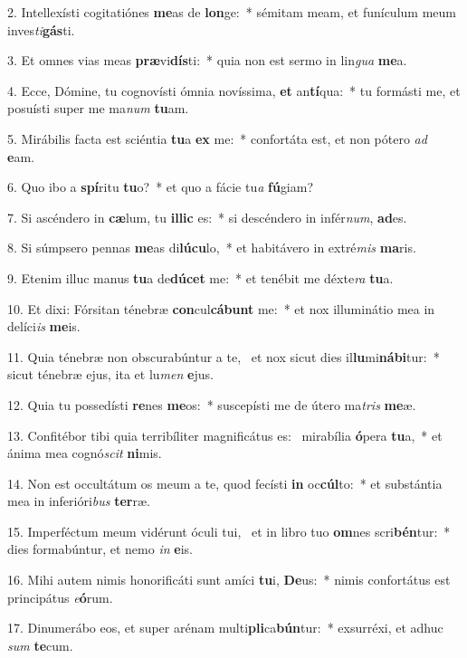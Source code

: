 2. Intellexísti cogitatiónes \textbf{me}as de \textbf{lon}ge:~*  sémitam meam, et funículum meum inves\textit{ti}\textbf{gás}ti.\

3. Et omnes vias meas \textbf{præ}vi\textbf{dís}ti:~*  quia non est sermo in lin\textit{gua} \textbf{me}a.\

4. Ecce, Dómine, tu cognovísti ómnia novíssima, \textbf{et} an\textbf{tí}qua:~*  tu formásti me, et posuísti super me ma\textit{num} \textbf{tu}am.\

5. Mirábilis facta est sciéntia \textbf{tu}a \textbf{ex} me:~*  confortáta est, et non pótero \textit{ad} \textbf{e}am.\

6. Quo ibo a \textbf{spí}ritu \textbf{tu}o?~*  et quo a fácie tu\textit{a} \textbf{fú}giam?\

7. Si ascéndero in \textbf{cæ}lum, tu \textbf{il}\textbf{lic} es:~*  si descéndero in infér\textit{num}, \textbf{ad}es.\

8. Si súmpsero pennas \textbf{me}as di\textbf{lú}\textbf{cu}lo,~*  et habitávero in extré\textit{mis} \textbf{ma}ris.\

9. Etenim illuc manus \textbf{tu}a de\textbf{dú}\textbf{cet} me:~*  et tenébit me déxte\textit{ra} \textbf{tu}a.\

10. Et dixi: Fórsitan ténebræ \textbf{con}cul\textbf{cá}\textbf{bunt} me:~*  et nox illuminátio mea in delíci\textit{is} \textbf{me}is.\

11. Quia ténebræ non obscurabúntur a te, \dag\  et nox sicut dies il\textbf{lu}mi\textbf{ná}\textbf{bi}tur:~*  sicut ténebræ ejus, ita et lu\textit{men} \textbf{e}jus.\

12. Quia tu possedísti \textbf{re}nes \textbf{me}os:~*  suscepísti me de útero ma\textit{tris} \textbf{me}æ.\

13. Confitébor tibi quia terribíliter magnificátus es: \dag\  mirabília \textbf{ó}pera \textbf{tu}a,~*  et ánima mea cognó\textit{scit} \textbf{ni}mis.\

14. Non est occultátum os meum a te, quod fecísti \textbf{in} oc\textbf{cúl}to:~*  et substántia mea in inferióri\textit{bus} \textbf{ter}ræ.\

15. Imperféctum meum vidérunt óculi tui, \dag\  et in libro tuo \textbf{om}nes scri\textbf{bén}tur:~*  dies formabúntur, et nemo \textit{in} \textbf{e}is.\

16. Mihi autem nimis honorificáti sunt amíci \textbf{tu}i, \textbf{De}us:~*  nimis confortátus est principátus \textit{e}\textbf{ó}rum.\

17. Dinumerábo eos, et super arénam multi\textbf{pli}ca\textbf{bún}tur:~*  exsurréxi, et adhuc \textit{sum} \textbf{te}cum.\

